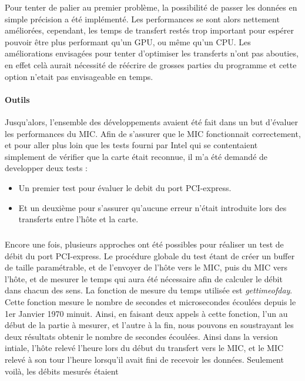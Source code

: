 \documentclass{article}
\begin{document}
					Pour tenter de palier au premier problème, la possibilité de passer les données en simple précision a été 
					implémenté. Les performances se sont alors nettement améliorées, cependant, les temps de transfert restés trop 
					important pour espérer pouvoir être plus performant qu'un GPU, ou même qu'un CPU. \newline
					Les améliorations envisagées pour tenter d'optimiser les transferts n'ont pas abouties, en effet celà aurait 
					nécessité de réécrire de grosses parties du programme et cette option n'etait pas envisageable en temps.
				\paragraph{Outils}
					Jusqu'alors, l'ensemble des développements avaient été fait dans un but d'évaluer les performances du MIC. 
					Afin de s'assurer que le MIC fonctionnait correctement, et pour aller plus loin que les tests fourni par 
					Intel qui se contentaient simplement de vérifier que la carte était reconnue, il m'a été demandé de 
					developper deux tests : \newline
					\begin{itemize}
					\item Un premier test pour évaluer le debit du port PCI-express.
					\item Et un deuxième pour s'assurer qu'aucune erreur n'était introduite lors des transferts entre
					l'hôte et la carte.
					\end{itemize}
					\subparagraph{}
					Encore une fois, plusieurs approches ont été possibles pour réaliser un test de débit du port PCI-express.
					Le procédure globale du test étant de créer un buffer de taille paramétrable, et de l'envoyer de l'hôte 
					vers le MIC, puis du MIC vers l'hôte, et de mesurer le temps qui aura été nécessaire afin de calculer le 
					débit dans chacun des sens. La fonction de mesure du temps utilisée est \emph{gettimeofday}. Cette fonction 
					mesure le nombre de secondes et microsecondes écoulées depuis le 1er Janvier 1970 minuit. Ainsi, en faisant 
					deux appels à cette fonction, l'un au début de la partie à mesurer, et l'autre à la fin, nous pouvons en 
					soustrayant les deux résultats obtenir le nombre de secondes écoulées.\newline
					Ainsi dans la version intiale, l'hôte relevé l'heure lors du début du transfert vers le MIC, et le MIC relevé 
					à son tour l'heure lorsqu'il avait fini de recevoir les données. Seulement voilà, les débits mesurés étaient 
\end{document}
